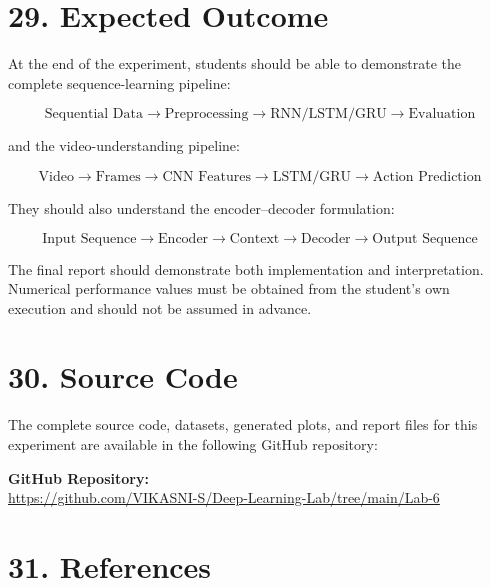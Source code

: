 \documentclass[10pt]{article}
\begin{document}
\section*{29. Expected Outcome}

At the end of the experiment, students should be able to demonstrate the
complete sequence-learning pipeline:

\[
\boxed{
\text{Sequential Data}
\rightarrow
\text{Preprocessing}
\rightarrow
\text{RNN/LSTM/GRU}
\rightarrow
\text{Evaluation}
}
\]

and the video-understanding pipeline:

\[
\boxed{
\text{Video}
\rightarrow
\text{Frames}
\rightarrow
\text{CNN Features}
\rightarrow
\text{LSTM/GRU}
\rightarrow
\text{Action Prediction}
}
\]

They should also understand the encoder--decoder formulation:

\[
\boxed{
\text{Input Sequence}
\rightarrow
\text{Encoder}
\rightarrow
\text{Context}
\rightarrow
\text{Decoder}
\rightarrow
\text{Output Sequence}
}
\]

The final report should demonstrate both implementation and interpretation.
Numerical performance values must be obtained from the student's own
execution and should not be assumed in advance.


\section*{30. Source Code}


The complete source code, datasets, generated plots, and report files for this experiment are available in the following GitHub repository:



\noindent\textbf{GitHub Repository:} \\
\url{https://github.com/VIKASNI-S/Deep-Learning-Lab/tree/main/Lab-6}\\

\section*{31. References}
\end{document}
